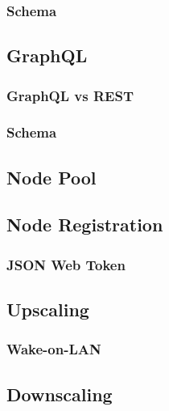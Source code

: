 \subsubsection{Schema}
\label{subsubsec:implementation_server_database_schema}

\subsection{GraphQL}
\label{subsec:implementation_server_graphql}

\subsubsection{GraphQL vs REST}
\label{subsubsec:implementation_server_graphql_graphql_vs_rest}

\subsubsection{Schema}
\label{subsubsec:implementation_server_graphql_schema}

\subsection{Node Pool}
\label{subsec:implementation_server_node_pool}

\subsection{Node Registration}
\label{subsec:implementation_server_node_registration}

\subsubsection{JSON Web Token}
\label{subsubsec:implementation_server_node_registration_json_web_token}

\subsection{Upscaling}
\label{subsec:implementation_server_upscaling}

\subsubsection{Wake-on-LAN}
\label{subsubsec:implementation_server_scale_up_wake_on_lan}

\subsection{Downscaling}
\label{subsec:implementation_server_downscaling}

